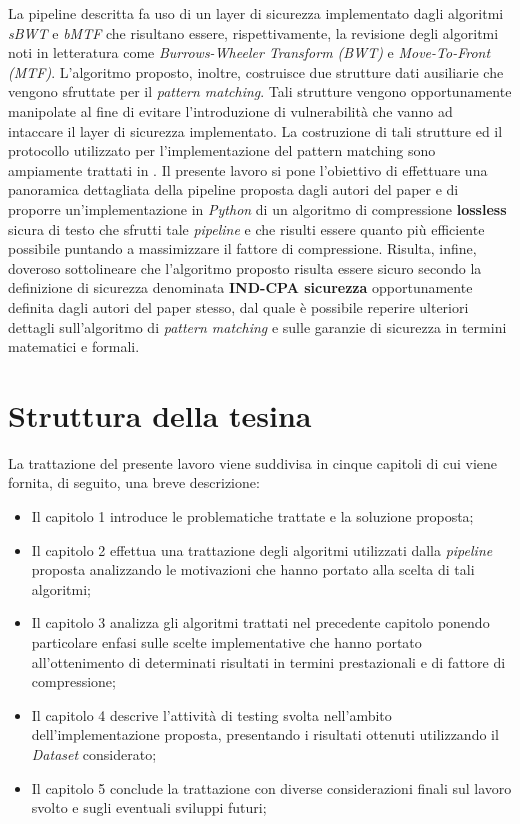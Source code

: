 La pipeline descritta fa uso di un layer di sicurezza implementato dagli algoritmi \emph{sBWT} e \emph{bMTF} che risultano essere, rispettivamente, la revisione degli algoritmi noti in letteratura come \emph{Burrows-Wheeler Transform (BWT)} e \emph{Move-To-Front (MTF)}. L'algoritmo proposto, inoltre, costruisce due strutture dati ausiliarie che vengono sfruttate per il \emph{pattern matching}. Tali strutture vengono opportunamente manipolate al fine di evitare l'introduzione di vulnerabilità che vanno ad intaccare il layer di sicurezza implementato. La costruzione di tali strutture ed il protocollo utilizzato per l'implementazione del pattern matching sono ampiamente trattati in \cite{zeng2018secure}. Il presente lavoro si pone l'obiettivo di effettuare una panoramica dettagliata della pipeline proposta dagli autori del paper \cite{zeng2018secure} e di proporre un'implementazione in \emph{Python} di un algoritmo di compressione \textbf{lossless} sicura di testo che sfrutti tale \emph{pipeline} e che risulti essere quanto più efficiente possibile puntando a massimizzare il fattore di compressione. Risulta, infine, doveroso sottolineare che l'algoritmo proposto risulta essere sicuro secondo la definizione di sicurezza denominata \textbf{IND-CPA sicurezza} opportunamente definita dagli autori del paper \cite{zeng2018secure} stesso, dal quale è possibile reperire ulteriori dettagli sull'algoritmo di \emph{pattern matching} e sulle garanzie di sicurezza in termini matematici e formali.
\section{Struttura della tesina} 
La trattazione del presente lavoro viene suddivisa in cinque capitoli di cui viene fornita, di seguito, una breve descrizione:
\begin{itemize}
    \item Il capitolo 1 introduce le problematiche trattate e la soluzione proposta;
    \item Il capitolo 2 effettua una trattazione degli algoritmi utilizzati dalla \emph{pipeline} proposta analizzando le motivazioni che hanno portato alla scelta di tali algoritmi;
    \item Il capitolo 3 analizza gli algoritmi trattati nel precedente capitolo ponendo particolare enfasi sulle scelte implementative che hanno portato all'ottenimento di determinati risultati in termini prestazionali e di fattore di compressione;
    \item Il capitolo 4 descrive l'attività di testing svolta nell'ambito dell'implementazione proposta, presentando i risultati ottenuti utilizzando il \emph{Dataset} considerato;
    \item Il capitolo 5 conclude la trattazione con diverse considerazioni finali sul lavoro svolto e sugli eventuali sviluppi futuri;
\end{itemize}